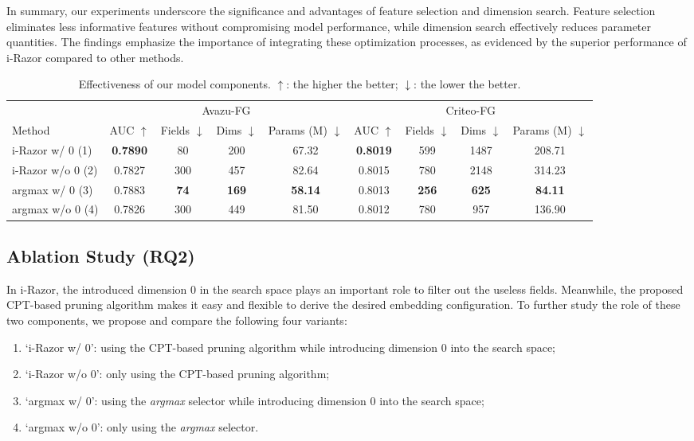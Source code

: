 \documentclass[10pt,journal,compsoc]{IEEEtran}
\begin{document}
In summary, our experiments underscore the significance and advantages of feature selection and dimension search. Feature selection eliminates less informative features without compromising model performance, while dimension search effectively reduces parameter quantities.  The findings emphasize the importance of integrating these optimization processes, as evidenced by the superior performance of i-Razor compared to other methods.

\begin{table*}[thp]
\caption{Effectiveness of our model components. $\uparrow$: the higher the better; $\downarrow$: the lower the better.}
\centering
\begin{tabular}{lcccccccc}
\toprule[1pt]
 & \multicolumn{4}{c}{Avazu-FG} & \multicolumn{4}{c}{Criteo-FG} \\ \cmidrule(r){2-5} \cmidrule(r){6-9} 
Method & AUC $\uparrow$ & Fields $\downarrow$ & Dims $\downarrow$ & Params (M) $\downarrow$ & AUC $\uparrow$ & Fields $\downarrow$ & Dims $\downarrow$ & Params (M) $\downarrow$\\ \midrule
i-Razor w/ 0 (1) & \textbf{0.7890} & 80 & 200 & 67.32 & \textbf{0.8019} & 599 & 1487 & 208.71 \\
i-Razor w/o 0 (2) & 0.7827 & 300 & 457 & 82.64 & 0.8015 & 780 & 2148 & 314.23 \\
argmax w/ 0 (3) & 0.7883 & \textbf{74} & \textbf{169} & \textbf{58.14} & 0.8013 & \textbf{256} & \textbf{625} & \textbf{84.11} \\
argmax w/o 0 (4) & 0.7826 & 300 & 449 & 81.50 & 0.8012 & 780 & 957 & 136.90 \\ \bottomrule[1pt]
\end{tabular}
\label{tab:ablation}
\end{table*}

\subsection{Ablation Study (RQ2)}
In i-Razor, the introduced dimension 0 in the search space plays an important role to filter out the useless fields. Meanwhile, the proposed CPT-based pruning algorithm makes it easy and flexible to derive the desired embedding configuration. To further study the role of these two components, we propose and compare the following four variants:
\begin{enumerate}
    \item `i-Razor w/ 0': using the CPT-based pruning algorithm while introducing dimension 0 into the search space;
    \item `i-Razor w/o 0': only using the CPT-based pruning algorithm;
    \item `argmax w/ 0': using the \emph{argmax} selector while introducing dimension 0 into the search space;
    \item `argmax w/o 0': only using the \emph{argmax} selector.
\end{enumerate}
\end{document}

